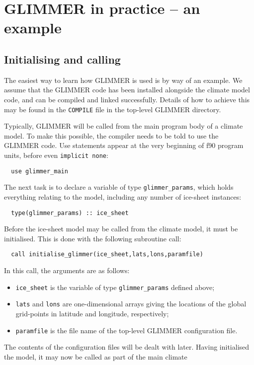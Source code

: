 \section{GLIMMER in practice -- an example}

\subsection{Initialising and calling}

The easiest way to learn how GLIMMER is used is by way of an
example. We assume that the GLIMMER code has been installed alongside the
climate model code, and can be compiled and linked successfully. Details of
how to achieve this may be found in the \texttt{COMPILE} file in the top-level
GLIMMER directory. 

Typically, GLIMMER will be called from the main program body of a
climate model. To make this possible, the compiler needs to be told to use the
GLIMMER code. Use statements appear at the very beginning of f90 program
units, before even \texttt{implicit none}:
%
\begin{verbatim}
  use glimmer_main
\end{verbatim}
%
The next task is to declare a variable of type \texttt{glimmer\_params}, which
holds everything relating to the model, including any number of ice-sheet
instances:
%
\begin{verbatim}
  type(glimmer_params) :: ice_sheet
\end{verbatim}
%
Before the ice-sheet model may be called from the climate model, it must be
initialised. This is done with the following subroutine call:
%
\begin{verbatim}
  call initialise_glimmer(ice_sheet,lats,lons,paramfile)
\end{verbatim}
%
In this call, the arguments are as follows:
%
\begin{itemize}
\item \texttt{ice\_sheet} is the variable of type \texttt{glimmer\_params}
 defined above;
\item \texttt{lats} and \texttt{lons} are one-dimensional arrays giving the
  locations of the global grid-points in latitude and longitude, respectively; 
\item \texttt{paramfile} is the file name of the top-level GLIMMER
  configuration file.
\end{itemize}
%
The contents of the configuration files will be dealt with later. Having
initialised the model, it may now be called as part of the main climate
